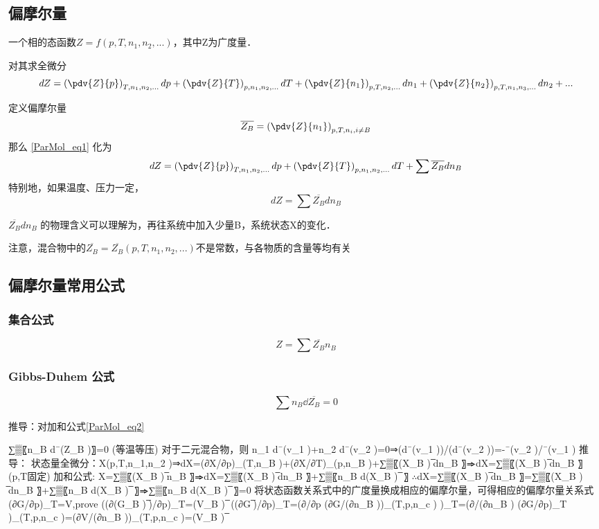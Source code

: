 
\subsection{偏摩尔量}
一个相的态函数$Z=f(p,T,n_1,n_2,...)$，其中Z为广度量．

对其求全微分  
\begin{equation}\label{ParMol_eq1}
dZ = \left(\pdv{Z}{p}\right)_{T,n_1,n_2,...}dp + \left(\pdv{Z}{T}\right)_{p,n_1,n_2,...}dT+\left(\pdv{Z}{n_1}\right)_{p,T,n_2,...}dn_1+\left(\pdv{Z}{n_2}\right)_{p,T,n_1,n_3,...}dn_2+...
\end{equation}

定义偏摩尔量
\begin{equation}
\overline {Z_B} = \left(\pdv{Z}{n_1}\right)_{p,T,n_i, i \neq B} 
\end{equation}
那么 \autoref{ParMol_eq1} 化为 
\begin{equation}
dZ = \left(\pdv{Z}{p}\right)_{T,n_1,n_2,...}dp + \left(\pdv{Z}{T}\right)_{p,n_1,n_2,...}dT+\sum \overline {Z_B} dn_B
\end{equation}
特别地，如果温度、压力一定，
\begin{equation}
dZ = \sum \overline {Z_B} dn_B
\end{equation}

$\overline {Z_B} d n_B$ 的物理含义可以理解为，再往系统中加入少量B，系统状态X的变化．

注意，混合物中的$\overline {Z_B}=\overline {Z_B}(p,T,n_1,n_2,...)$不是常数，与各物质的含量等均有关

\subsection{偏摩尔量常用公式}
\subsubsection{集合公式}
\begin{equation}\label{ParMol_eq2}
Z=\sum \overline {Z_B}  n_B
\end{equation}
\subsubsection{Gibbs-Duhem 公式}
\begin{equation}
\sum n_B \dd {\overline {Z_B}} = 0
\end{equation}

推导：对加和公式\autoref{ParMol_eq2} 


	∑▒〖n_B d¯(Z_B )〗=0 (等温等压)
	对于二元混合物，则 n_1 d¯(v_1 )+n_2 d¯(v_2 )=0⇒(d¯(v_1 ))/(d¯(v_2 ))=-¯(v_2 )/¯(v_1 )
	推导：
	状态量全微分：X(p,T,n_1,n_2 )⇒dX=(∂X/∂p)_(T,n_B )+(∂X/∂T)_(p,n_B )+∑▒〖(X_B ) ̅dn_B 〗⇒dX=∑▒〖(X_B ) ̅dn_B 〗  (p,T固定)
	加和公式: X=∑▒〖(X_B ) ̅n_B 〗⇒dX=∑▒〖(X_B ) ̅dn_B 〗+∑▒〖n_B d(X_B ) ̅ 〗
	∴dX=∑▒〖(X_B ) ̅dn_B 〗=∑▒〖(X_B ) ̅dn_B 〗+∑▒〖n_B d(X_B ) ̅ 〗⇒∑▒〖n_B d(X_B ) ̅ 〗=0
	将状态函数关系式中的广度量换成相应的偏摩尔量，可得相应的偏摩尔量关系式
	(∂G/∂p)_T=V,prove ((∂(G_B ) ̅)/∂p)_T=(V_B ) ̅
	((∂G ̅)/∂p)_T=(∂/∂p (∂G/(∂n_B ))_(T,p,n_c ) )_T=(∂/(∂n_B ) (∂G/∂p)_T )_(T,p,n_c )=(∂V/(∂n_B ))_(T,p,n_c )=(V_B ) ̅
